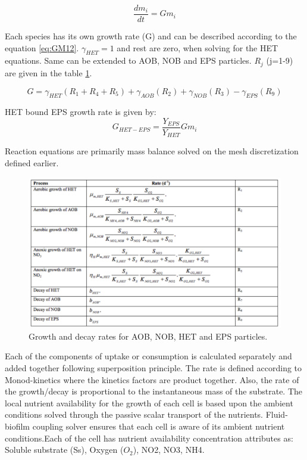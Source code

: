 \documentclass[11pt,a4paper,openright]{article}
\begin{document}
\begin{equation}
\label{eq:GM}
\frac{dm_{i}}{dt} = Gm_{i}
\end{equation}

Each species has its own growth rate (G) and can be described according to the equation \ref{eq:GM12}. $\gamma_{HET} = 1$ and rest are zero, when solving for the HET equations. Same can be extended to AOB, NOB and EPS particles. $R_{j}$ (j=1-9) are given in the table \ref{fig:gdrates}.

\begin{equation}
\label{eq:GM12}
G = \gamma_{HET}\left ( R_1 + R_4 + R_5 \right )+\gamma_{AOB}\left ( R_2 \right ) + \gamma_{NOB}\left ( R_3\right ) -\gamma_{EPS}\left ( R_9\right )
\end{equation}

HET bound EPS growth rate is given by:
\begin{equation}
\label{eq:GMEPS}
G_{HET-EPS} = \frac{Y_{EPS}}{Y_{HET}} G m_{i}
\end{equation}

Reaction equations are primarily mass balance solved on the mesh discretization defined earlier. 

\begin{figure}[H]
\begin{center}
  \includegraphics[width=0.9\columnwidth]{Figs/Tableforrates.pdf}
\caption{Growth and decay rates for AOB, NOB, HET and EPS particles.}
\label{fig:gdrates}       %
\end{center}
\end{figure}  


Each of the components of uptake or consumption is calculated separately and added together following superposition principle. The rate is defined according to Monod-kinetics where the kinetics factors are product together. Also, the rate of the growth/decay is proportional to the instantaneous mass of the substrate. The local nutrient availability for the growth of each cell is based upon the ambient conditions solved through the passive scalar transport of the nutrients. Fluid-biofilm coupling solver ensures that each cell is aware of its ambient nutrient conditions.Each of the cell has nutrient availability concentration attributes as: Soluble substrate (Ss), Oxygen ($O_2$), NO2, NO3, NH4. 
\end{document}
